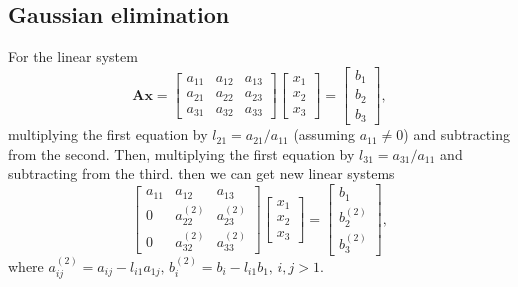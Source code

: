 \subsection{Gaussian elimination}
\begin{exm}
    \label{exm::GaussElimination}
    For the linear system
    $$
        \mathbf{A}\mathbf{x}=
        \begin{bmatrix}
            a_{11}&a_{12}&a_{13}\\
            a_{21}&a_{22}&a_{23}\\
            a_{31}&a_{32}&a_{33}
        \end{bmatrix}
        \begin{bmatrix}
            x_1\\x_2\\x_3
        \end{bmatrix}=
        \begin{bmatrix}
            b_1\\b_2\\b_3
        \end{bmatrix},
    $$ 
    multiplying the first equation by $l_{21}=a_{21}/a_{11}$
    (assuming $a_{11}\neq 0$) and subtracting from the second. 
    Then, multiplying the first equation by 
    $l_{31}=a_{31}/a_{11}$ and subtracting from the third.
    then we can get new linear systems
    $$
    \begin{bmatrix}
        a_{11}&a_{12}&a_{13}\\
        0&a_{22}^{(2)}&a_{23}^{(2)}\\
        0&a_{32}^{(2)}&a_{33}^{(2)}
    \end{bmatrix}
    \begin{bmatrix}
        x_1\\x_2\\x_3
    \end{bmatrix}=
    \begin{bmatrix}
        b_1\\b_2^{(2)}\\b_3^{(2)}
    \end{bmatrix},
    $$ 
    where $a_{ij}^{(2)}=a_{ij}-l_{i1}a_{1j},\,b_{i}^{(2)}=b_i
    -l_{i1}b_1,\,i,j>1$.


\end{exm}
